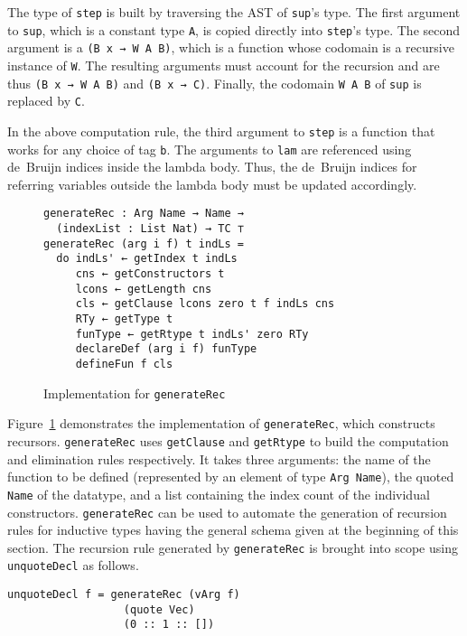 \documentclass[sigplan,10pt]{acmart}
\begin{document}
The type of {\tt step} is built by traversing the AST of {\tt sup}'s type.
The first argument to {\tt sup}, which is a constant type {\tt A}, is copied directly into \texttt{step}'s type.
The second argument is a {\tt (B x → W A B)}, which is a function whose codomain is a recursive instance of {\tt W}.
The resulting arguments must account for the recursion and are thus {\tt (B x → W A B)} and \texttt{(B x → C)}.
Finally, the codomain {\tt W A B} of {\tt sup} is replaced by {\tt C}.

In the above computation rule, the third argument to {\tt step} is a function that works for any choice of tag \texttt{b}.
The arguments to {\tt lam} are referenced using de~Bruijn indices inside the lambda body.
Thus, the de~Bruijn indices for referring variables outside the lambda body must be updated accordingly.



\begin{figure}
\begin{center}
\begin{Verbatim}
generateRec : Arg Name → Name → 
  (indexList : List Nat) → TC ⊤
generateRec (arg i f) t indLs =
  do indLs' ← getIndex t indLs
     cns ← getConstructors t
     lcons ← getLength cns
     cls ← getClause lcons zero t f indLs cns
     RTy ← getType t
     funType ← getRtype t indLs' zero RTy
     declareDef (arg i f) funType
     defineFun f cls
\end{Verbatim}
\end{center}
\caption{Implementation for {\tt generateRec}}
\label{fig:generateRec}
\end{figure}

Figure~\ref{fig:generateRec} demonstrates the implementation of {\tt generateRec}, which constructs recursors.
{\tt generateRec} uses {\tt getClause} and {\tt getRtype} to build the computation and elimination rules respectively. It takes three arguments: the name of the function to be defined (represented by an element of type {\tt Arg Name}), the quoted {\tt Name} of the datatype, and a list containing the index count of the individual constructors. {\tt generateRec} can be used to automate the generation of recursion rules for inductive types having the general schema given at the beginning of this section. The recursion rule generated by {\tt generateRec} is brought into scope using {\tt unquoteDecl} as follows.

\begin{center}
\begin{BVerbatim}
unquoteDecl f = generateRec (vArg f)
                  (quote Vec) 
                  (0 :: 1 :: [])
\end{BVerbatim}
\end{center}
\end{document}
